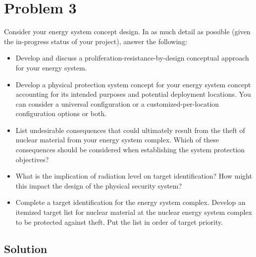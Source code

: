 \documentclass[a4paper]{article}
\begin{document}
\section*{Problem 3}
Consider your energy system concept design. In as much detail as possible (given the in-progress status of your project), answer the following:
\begin{itemize}
\item Develop and discuss a proliferation-resistance-by-design conceptual approach for your energy system.
\item Develop a physical protection system concept for your energy system concept accounting for its intended purposes and potential deployment locations. You can consider a universal configuration or a customized-per-location configuration options or both.
\item List undesirable consequences that could ultimately result from the theft of nuclear material from your energy system complex. Which of these consequences should be considered when establishing the system protection objectives?
\item What is the implication of radiation level on target identification? How might this impact the design of the physical security system?
\item Complete a target identification for the energy system complex. Develop an itemized target list for nuclear material at the nuclear energy system complex to be protected against theft. Put the list in order of target priority.
\end{itemize}
\subsection*{Solution}



\newpage
\end{document}
